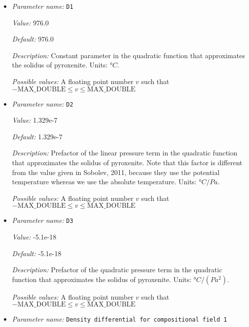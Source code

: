 \begin{itemize}
{\it Default:} 5.124e-12


{\it Description:} The value of the compressibility $\kappa$. Units: $1/Pa$.


{\it Possible values:} A floating point number $v$ such that $0 \leq v \leq \text{MAX\_DOUBLE}$
\item {\it Parameter name:} {\tt D1}
\label{parameters:Material model/Latent heat melt/D1}


{\it Value:} 976.0


{\it Default:} 976.0


{\it Description:} Constant parameter in the quadratic function that approximates the solidus of pyroxenite. Units: $°C$.


{\it Possible values:} A floating point number $v$ such that $-\text{MAX\_DOUBLE} \leq v \leq \text{MAX\_DOUBLE}$
\item {\it Parameter name:} {\tt D2}
\label{parameters:Material model/Latent heat melt/D2}


{\it Value:} 1.329e-7


{\it Default:} 1.329e-7


{\it Description:} Prefactor of the linear pressure term in the quadratic function that approximates the solidus of pyroxenite. Note that this factor is different from the value given in Sobolev, 2011, because they use the potential temperature whereas we use the absolute temperature. Units: $°C/Pa$.


{\it Possible values:} A floating point number $v$ such that $-\text{MAX\_DOUBLE} \leq v \leq \text{MAX\_DOUBLE}$
\item {\it Parameter name:} {\tt D3}
\label{parameters:Material model/Latent heat melt/D3}


{\it Value:} -5.1e-18


{\it Default:} -5.1e-18


{\it Description:} Prefactor of the quadratic pressure term in the quadratic function that approximates the solidus of pyroxenite. Units: $°C/(Pa^2)$.


{\it Possible values:} A floating point number $v$ such that $-\text{MAX\_DOUBLE} \leq v \leq \text{MAX\_DOUBLE}$
\item {\it Parameter name:} {\tt Density differential for compositional field 1}
\label{parameters:Material model/Latent heat melt/Density differential for compositional field 1}



\end{itemize}
